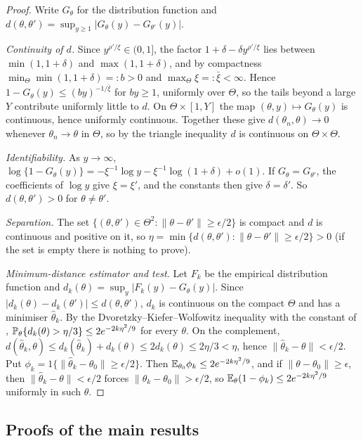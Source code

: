 \begin{proof}
Write $G_\theta$ for the distribution function and $d(\theta,\theta')=\sup_{y\ge1}|G_\theta(y)-G_{\theta'}(y)|$.

\emph{Continuity of $d$.} Since $y^{\rho'/\xi}\in(0,1]$, the factor $1+\delta-\delta y^{\rho'/\xi}$
lies between $\min(1,1+\delta)$ and $\max(1,1+\delta)$, and by compactness
$\min_\Theta\min(1,1+\delta)=:b>0$ and $\max_\Theta\xi=:\bar\xi<\infty$. Hence
$1-G_\theta(y)\le(by)^{-1/\bar\xi}$ for $by\ge1$, uniformly over $\Theta$, so the tails beyond
a large $Y$ contribute uniformly little to $d$. On $\Theta\times[1,Y]$ the map
$(\theta,y)\mapsto G_\theta(y)$ is continuous, hence uniformly continuous. Together these give
$d(\theta_n,\theta)\to0$ whenever $\theta_n\to\theta$ in $\Theta$, so by the triangle inequality
$d$ is continuous on $\Theta\times\Theta$.

\emph{Identifiability.} As $y\to\infty$,
$\log\{1-G_\theta(y)\}=-\xi^{-1}\log y-\xi^{-1}\log(1+\delta)+o(1)$. If $G_\theta=G_{\theta'}$, the
coefficients of $\log y$ give $\xi=\xi'$, and the constants then give $\delta=\delta'$. So
$d(\theta,\theta')>0$ for $\theta\ne\theta'$.

\emph{Separation.} The set $\{(\theta,\theta')\in\Theta^2:\|\theta-\theta'\|\ge\epsilon/2\}$ is
compact and $d$ is continuous and positive on it, so
$\eta=\min\{d(\theta,\theta'):\|\theta-\theta'\|\ge\epsilon/2\}>0$ (if the set is empty there is
nothing to prove).

\emph{Minimum-distance estimator and test.} Let $F_k$ be the empirical distribution function and
$d_k(\theta)=\sup_y|F_k(y)-G_\theta(y)|$. Since $|d_k(\theta)-d_k(\theta')|\le d(\theta,\theta')$,
$d_k$ is continuous on the compact $\Theta$ and has a minimiser $\hat\theta_k$. By the
Dvoretzky--Kiefer--Wolfowitz inequality with the constant of \citet{massart1990},
$\mathbb{P}_\theta\{d_k(\theta)>\eta/3\}\le2e^{-2k\eta^2/9}$ for every $\theta$. On the complement,
$d(\hat\theta_k,\theta)\le d_k(\hat\theta_k)+d_k(\theta)\le2d_k(\theta)\le2\eta/3<\eta$, hence
$\|\hat\theta_k-\theta\|<\epsilon/2$. Put $\phi_k=1\{\|\hat\theta_k-\theta_0\|\ge\epsilon/2\}$. Then
$\mathbb{E}_{\theta_0}\phi_k\le2e^{-2k\eta^2/9}$, and if $\|\theta-\theta_0\|\ge\epsilon$, then
$\|\hat\theta_k-\theta\|<\epsilon/2$ forces $\|\hat\theta_k-\theta_0\|>\epsilon/2$, so
$\mathbb{E}_\theta(1-\phi_k)\le2e^{-2k\eta^2/9}$ uniformly in such $\theta$. \qedhere
\end{proof}

\subsection{Proofs of the main results}

